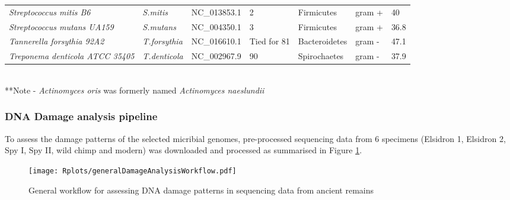 \documentclass[12pt, a4paper]{article}
\begin{document}
\begin{landscape}
\begin{table}[h]
\begin{tabular}{C{7cm} L{2.5cm} L{3.5cm} C{2cm} L{2.5cm} C{2.5cm} L{1.5cm} }
		{\textit{Streptococcus mitis B6}}&{\textit{S.mitis}}&{NC\_013853.1}&{2}&{Firmicutes}&{gram +}&{40}\\[5pt]
		{\textit{Streptococcus mutans UA159}}&{\textit{S.mutans}}&{NC\_004350.1}&{3}&{Firmicutes}&{gram +}&{36.8}\\[5pt]
		{\textit{Tannerella forsythia 92A2}}&{\textit{T.forsythia}}&{NC\_016610.1}&{Tied for 81}&{Bacteroidetes}&{gram -}&{47.1}\\[5pt]
		{\textit{Treponema denticola ATCC 35405}}&{\textit{T.denticola}}&{NC\_002967.9}&{90}&{Spirochaetes}&{gram -}&{37.9}\\
		\bottomrule
		\end{tabular}
		\\[10pt]		
		**Note - \textit{Actinomyces oris} was formerly named \textit{Actinomyces naeslundii}

\end{table}
\end{landscape}

\subsubsection{DNA Damage analysis pipeline}

To assess the damage patterns of the selected micribial genomes, pre-processed sequencing data from 6 specimens (Elsidron 1, Elsidron 2, Spy I, Spy II, wild chimp and modern) was downloaded and processed as summarised in Figure \ref{fig:damageAnalysisWorkflow}.



\begin{figure}[H]
\singlespace
\centering
\texttt{[image: Rplots/generalDamageAnalysisWorkflow.pdf]}
\caption{General workflow for assessing DNA damage patterns in sequencing data from ancient remains} \small{}\label{fig:damageAnalysisWorkflow}
\end{figure}
\end{document}
